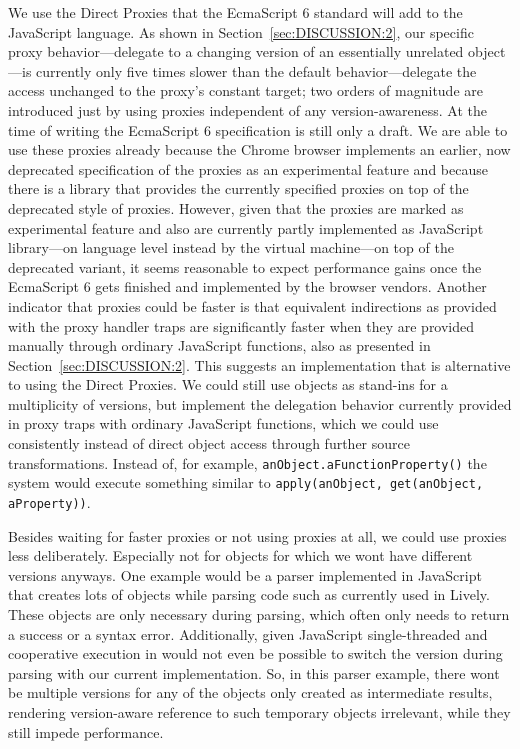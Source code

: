 We use the Direct Proxies that the EcmaScript 6 standard will add to the JavaScript language.
As shown in Section~\ref{sec:DISCUSSION:2}, our specific proxy behavior---delegate to a changing version of an essentially unrelated object---is currently only five times slower than the default behavior---delegate the access unchanged to the proxy's constant target; two orders of magnitude are introduced just by using proxies independent of any version-awareness.
At the time of writing the EcmaScript 6 specification is still only a draft.
We are able to use these proxies already because the Chrome browser implements an earlier, now deprecated specification of the proxies as an experimental feature and because there is a library that provides the currently specified proxies on top of the deprecated style of proxies.
However, given that the proxies are marked as experimental feature and also are currently partly implemented as JavaScript library---on language level instead by the virtual machine---on top of the deprecated variant, it seems reasonable to expect performance gains once the EcmaScript 6 gets finished and implemented by the browser vendors.
Another indicator that proxies could be faster is that equivalent indirections as provided with the proxy handler traps are significantly faster when they are provided manually through ordinary JavaScript functions, also as presented in Section~\ref{sec:DISCUSSION:2}.
This suggests an implementation that is alternative to using the Direct Proxies.
We could still use objects as stand-ins for a multiplicity of versions, but implement the delegation behavior currently provided in proxy traps with ordinary JavaScript functions, which we could use consistently instead of direct object access through further source transformations.
Instead of, for example, \lstinline{anObject.aFunctionProperty()} the system would execute something similar to \lstinline{apply(anObject, get(anObject, aProperty))}.

Besides waiting for faster proxies or not using proxies at all, we could use proxies less deliberately.
Especially not for objects for which we wont have different versions anyways.
One example would be a parser implemented in JavaScript that creates lots of objects while parsing code such as currently used in Lively.
These objects are only necessary during parsing, which often only needs to return a success or a syntax error.
Additionally, given JavaScript single-threaded and cooperative execution in would not even be possible to switch the version during parsing with our current implementation.
So, in this parser example, there wont be multiple versions for any of the objects only created as intermediate results, rendering version-aware reference to such temporary objects irrelevant, while they still impede performance.


